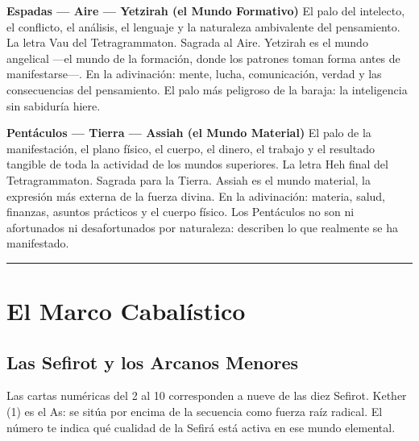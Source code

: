 \textbf{Espadas --- Aire --- Yetzirah (el Mundo Formativo)} El palo del intelecto, el conflicto, el análisis, el lenguaje y la naturaleza ambivalente del pensamiento. La letra Vau del Tetragrammaton. Sagrada al Aire. Yetzirah es el mundo angelical ---el mundo de la formación, donde los patrones toman forma antes de manifestarse---. En la adivinación: mente, lucha, comunicación, verdad y las consecuencias del pensamiento. El palo más peligroso de la baraja: la inteligencia sin sabiduría hiere.

\textbf{Pentáculos --- Tierra --- Assiah (el Mundo Material)} El palo de la manifestación, el plano físico, el cuerpo, el dinero, el trabajo y el resultado tangible de toda la actividad de los mundos superiores. La letra Heh final del Tetragrammaton. Sagrada para la Tierra. Assiah es el mundo material, la expresión más externa de la fuerza divina. En la adivinación: materia, salud, finanzas, asuntos prácticos y el cuerpo físico. Los Pentáculos no son ni afortunados ni desafortunados por naturaleza: describen lo que realmente se ha manifestado.

\begin{center}\rule{0.5\linewidth}{0.5pt}\end{center}

\section{El Marco Cabalístico}\label{the-qabalistic-framework}

\subsection{Las Sefirot y los Arcanos Menores}\label{the-sephiroth-and-the-minor-arcana}

Las cartas numéricas del 2 al 10 corresponden a nueve de las diez Sefirot. Kether (1) es el As: se sitúa por encima de la secuencia como fuerza raíz radical. El número te indica qué cualidad de la Sefirá está activa en ese mundo elemental.

